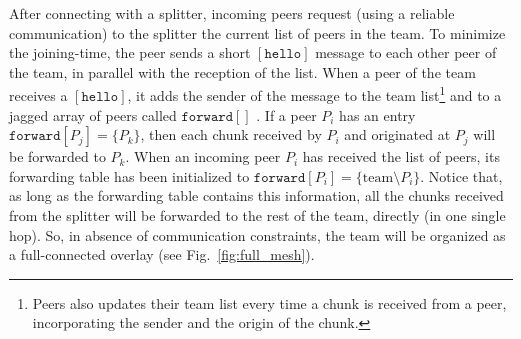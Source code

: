 

\label{sec:joining}

After connecting with a splitter, incoming peers request (using a
reliable communication) to the splitter the current list of peers in
the team. To minimize the \gls{joining-time}, the peer sends a short
$[\mathtt{hello}]$ message to each other peer of the team, in parallel
with the reception of the list. When a peer of the team receives a
$[\mathtt{hello}]$, it adds the sender of the message to the team
list\footnote{Peers also updates their team list every time a chunk is
  received from a peer, incorporating the sender and the origin of the
  chunk.} and to a jagged array of peers called $\mathtt{forward}[]$
. If a peer $P_i$ has an entry
$\mathtt{forward}[P_j]=\{P_k\}$, then each chunk received by $P_i$ and
originated at $P_j$ will be forwarded to $P_k$. When an incoming peer
$P_i$ has received the list of peers, its forwarding table has been
initialized to $\mathtt{forward}[P_i]=\{\text{team}\setminus
P_i\}$. Notice that, as long as the forwarding table contains this
information, all the chunks received from the splitter will be forwarded
to the rest of the team, directly (in one single hop). So, in absence
of communication constraints, the team will be organized as a
full-connected overlay (see Fig.~\ref{fig:full_mesh}).

